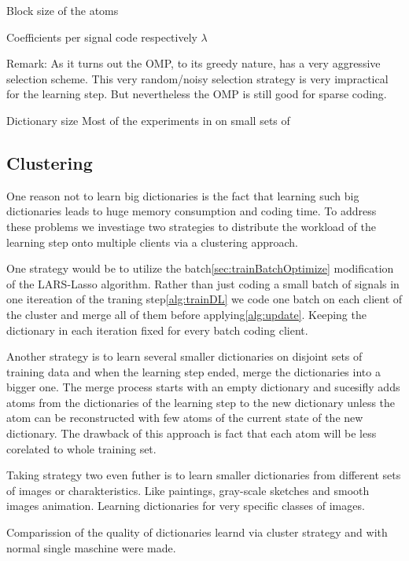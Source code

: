 Block size of the atoms

Coefficients per signal code respectively $\lambda$


Remark:
As it turns out the OMP, to its greedy nature, has a very aggressive selection
scheme. This very random/noisy selection strategy is very impractical
for the \trainDL learning step. But nevertheless the OMP is still good for
sparse coding. 



Dictionary size 
Most of the experiments in on small sets of 

\subsection{Clustering}
One reason not to learn big dictionaries is the fact that learning such big
dictionaries leads to huge memory consumption and coding time.
To address these problems we investiage two strategies to distribute the
workload of the learning step onto multiple clients via a clustering approach.

One strategy would be to utilize the batch\ref{sec:trainBatchOptimize}
modification of the LARS-Lasso algorithm. Rather than just coding a small batch
of signals in one itereation of the traning step\ref{alg:trainDL} we code one
batch on each client of the cluster and merge all of them before
applying\ref{alg:update}. Keeping the dictionary in each iteration fixed
for every batch coding client. 

Another strategy is to learn several smaller dictionaries on disjoint sets of
training data and when the learning step ended, merge the dictionaries
into a bigger one. The merge process starts with an empty dictionary and
sucesifly adds atoms from the dictionaries of the learning step to the
new dictionary unless the atom can be reconstructed with few atoms of the
current state of the new dictionary. The drawback of this approach is fact that 
each atom will be less corelated to whole training set.

Taking strategy two even futher is to learn smaller dictionaries from different
sets of images or charakteristics. Like paintings, gray-scale sketches and
smooth images animation. Learning dictionaries for very specific classes of
images.

Comparission of the quality of dictionaries learnd via cluster strategy and
with normal single maschine were made.

